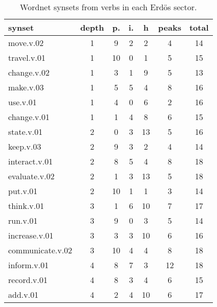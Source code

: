 \begin{table}[h!]
\begin{center}
\begin{tabular}{| l || c | c | c | c || c | c |}\hline
{\bf synset} & {\bf depth} & {\bf p.} & {\bf i.} & {\bf h} & {\bf peaks} & {\bf total} \\\hline\hline
move.v.02 & 1  & 9  & 2  & 2  & 4  & 14 \\
travel.v.01 & 1  & 10  & 0  & 1  & 5  & 15 \\
change.v.02 & 1  & 3  & 1  & 9  & 5  & 13 \\
make.v.03 & 1  & 5  & 5  & 4  & 8  & 16 \\
use.v.01 & 1  & 4  & 0  & 6  & 2  & 16 \\
change.v.01 & 1  & 1  & 4  & 8  & 6  & 15 \\\hline
state.v.01 & 2  & 0  & 3  & 13  & 5  & 16 \\
keep.v.03 & 2  & 9  & 3  & 2  & 4  & 14 \\
interact.v.01 & 2  & 8  & 5  & 4  & 8  & 18 \\
evaluate.v.02 & 2  & 1  & 3  & 13  & 5  & 18 \\
put.v.01 & 2  & 10  & 1  & 1  & 3  & 14 \\\hline
think.v.01 & 3  & 1  & 6  & 10  & 7  & 17 \\
run.v.01 & 3  & 9  & 0  & 3  & 5  & 14 \\
increase.v.01 & 3  & 3  & 3  & 10  & 6  & 16 \\
communicate.v.02 & 3  & 10  & 4  & 4  & 8  & 18 \\\hline
inform.v.01 & 4  & 8  & 7  & 3  & 12  & 18 \\
record.v.01 & 4  & 8  & 3  & 4  & 6  & 15 \\
add.v.01 & 4  & 2  & 4  & 10  & 6  & 17 \\\hline
\end{tabular}
\caption{Wordnet synsets from verbs in each Erd\"os sector.}
\end{center}
\end{table}
